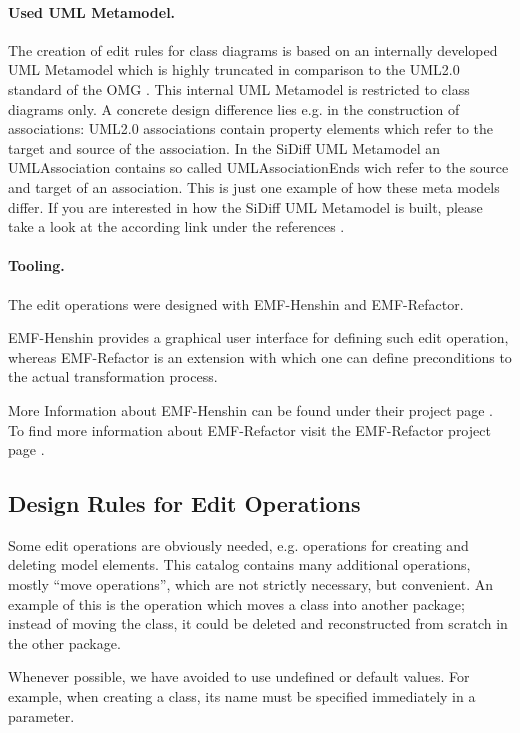 \documentclass[a4paper,DIV=10]{scrartcl}
\begin{document}
\paragraph{Used UML Metamodel.}
The creation of edit rules for class diagrams is based
on an internally developed UML Metamodel which is highly
truncated in comparison to the UML2.0 standard of the OMG \cite{OMG}.
This internal UML Metamodel is restricted to class diagrams only.
A concrete design difference lies e.g. in the construction of associations:
UML2.0 associations contain property elements which refer to the
target and source of the association. In the SiDiff UML Metamodel
an UMLAssociation contains so called UMLAssociationEnds wich refer
to the source and target of an association.
This is just one example of how these meta models differ.
If you are interested in how the SiDiff UML Metamodel is built,
please take a look at the according link under the references \cite{SiDiff-UML}.

\paragraph{Tooling.}
The edit operations were designed
with EMF-Henshin and EMF-Refactor.

EMF-Henshin provides a graphical user interface for
defining such edit operation, whereas EMF-Refactor is an
extension with which one can define preconditions to the
actual transformation process.

More Information about EMF-Henshin can be found under
their project page
\cite{Henshin}. To find more information about
EMF-Refactor visit the EMF-Refactor project page
\cite{Refactor}.



\subsection{Design Rules for Edit Operations} 

Some edit operations are obviously needed, e.g. operations
for creating and deleting model elements. This catalog
contains many additional operations, mostly ``move
operations'', which are not strictly necessary, but
convenient. An example of this is the operation which
moves a class into another package; instead of moving the
class, it could be deleted and reconstructed from scratch
in the other package.

Whenever possible, we have avoided to use undefined or default values. For
example, when creating a class, its name must be specified immediately in a parameter.
\end{document}
